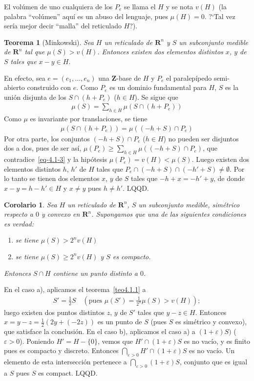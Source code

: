 \documentclass[bibtotoc,leqno,spanish]{amsbook}
\let\emph\relax %
\newcommand{\RR}{\mathbf{R}}
\newcommand{\ZZ}{\mathbf{Z}}
\newcommand{\QED}{LQQD.}
\numberwithin{equation}{section}
\theoremstyle{note}
\theoremstyle{note}
\newtheorem{theorem}{Teorema}
\newtheorem*{corollary*}{Corolario}
\theoremstyle{rem}
\numberwithin{theorem}{section}
\numberwithin{proposition}{section}
\numberwithin{definition}{section}
\numberwithin{lemma}{section}
\numberwithin{corollary}{section}
\numberwithin{example}{section}
\numberwithin{footnote}{section}%
\begin{document}
El vol\'umen de uno cualquiera de los $P_{e}$ se llama el \emph{vol\'umen del reticulado} $H$
y se nota
$v(H)$ (la palabra ``vol\'umen'' aqu\'i es un abuso del lenguaje, pues $\mu(H) = 0$. ?`Tal
vez ser\'ia mejor decir ``malla'' del reticulado $H$?).

\begin{theorem}[Minkowski]\label{teo4.1.2}
Sea $H$ un reticulado de $\RR^{n}$ y $S$ un subconjunto medible de $\RR^{n}$ tal
que $\mu(S) > v(H)$. Entonces existen
dos elementos distintos $x$, $y$ de $S$ tales que $x-y\in H$.
\end{theorem}

En efecto, sea $e = (e_{1},\dots,e_{n})$ una $\ZZ$-base de $H$ y $P_{e}$ el
paralep\'ipedo semi-abierto construido
con $e$. Como $P_{e}$ es un dominio fundamental para $H$, $S$ es la uni\'on disjunta de
los $S\cap (h+P_{e})$
($h\in H$). Se sigue que
\begin{gather}\label{eq-4.1-3}
\mu(S) = \sum_{h\in H}\mu(S\cap (h+P_{e}))
\end{gather}
Como $\mu$ es invariante por translaciones, se tiene
\begin{gather*}
\mu(S\cap (h+P_{e})) = \mu((-h+S)\cap P_{e})
\end{gather*}
Por otra parte, los conjuntos $(-h+S)\cap P_{e}$ ($h\in H$) no pueden ser disjuntos dos a
dos, pues de ser as\'i,
$\mu(P_{e})\geq\sum_{h\in H}\mu((-h+S)\cap P_{e})$, que contradice~\eqref{eq-4.1-3} y la
hip\'otesis $\mu(P_{e})=v(H)<\mu(S)$.
Luego existen dos elementos distintos $h$, $h'$ de $H$ tales que
$P_{e}\cap (-h+S)\cap (-h'+S)\neq\emptyset$.
Por lo tanto se tienen dos elementos $x$, $y$ de $S$ tales que $-h+x=-h'+y$, de donde
$x-y=h-h'\in H$ y
$x\neq y$ pues $h\neq h'$. \QED

\begin{corollary*}
Sea $H$ un reticulado de $\RR^{n}$, $S$ un subconjunto medible, sim\'etrico respecto a
$0$ y convexo en $\RR^{n}$.
Supongamos que una de las siguientes condiciones es verdad:
\begin{enumerate}
\item[a)] se tiene $\mu(S) > 2^{n}v(H)$
\item[b)] se tiene $\mu(S)\geq 2^{n}v(H)$ y $S$ es compacto.
\end{enumerate}
Entonces $S\cap H$ contiene un punto distinto a $0$.
\end{corollary*}

En el caso a), aplicamos el teorema~\ref{teo4.1.1} a
\begin{gather*}
S'=\frac{1}{2}S\quad\left(\text{pues }\mu(S')=\frac{1}{2^{n}}\mu(S)>v(H)\right);
\end{gather*}
luego existen dos puntos distintos $z$, $y$ de $S'$ tales que $y-z\in H$. Entonces
$x=y-z=\frac{1}{2}(2y+(-2z))$ es un punto de $S$ (pues $S$ es sim\'etrico y convexo),
que satisface la conclusi\'on. En el caso b), aplicamos el caso a) a
$(1+\varepsilon)S)$ ($\varepsilon > 0$). Poniendo $H' = H-\{0\}$, vemos que
$H'\cap (1+\varepsilon)S$ es no vac\'io, y es finito pues es compacto y discreto. Entonces
$\bigcap_{\varepsilon>0}H'\cap (1+\varepsilon)S$ es no vac\'io. Un elemento de esta intersecci\'on pertenece
a $\bigcap_{\varepsilon>0}(1+\varepsilon)S$, conjunto que es igual a $S$ pues $S$ es compact. \QED
\end{document}
